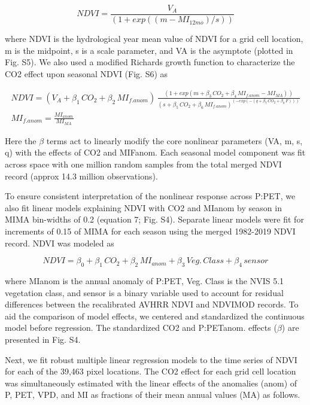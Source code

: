 \documentclass[gc, manuscript]{copernicus}
\begin{document}
\begin{equation}
NDVI = \frac{V_A}{(1+exp((m-MI_{12mo})/s))}
\end{equation}

where NDVI is the hydrological year mean value of NDVI for a grid cell
location, m is the midpoint, s is a scale parameter, and VA is the
asymptote (plotted in Fig. S5). We also used a modified Richards growth
function to characterize the CO2 effect upon seasonal NDVI (Fig. S6) as

\begin{align}
NDVI=(V_A+\beta_1\,CO_2+\beta_2\,MI_{f.anom})\,\frac{(1+exp(m+\beta_3\,CO_2+\beta_4\,MI_{f.anom} - MI_{MA}))}{(s+\beta_5\,CO_2+\beta_6\,MI_{f.anom})^{(-exp(-(q+\beta_7\,CO_2+\beta_8\,F)))}}\\
MI_{f.anom} = \frac{MI_{anom}}{MI_{MA}}\nonumber
\end{align}

Here the \(\beta\) terms act to linearly modify the core nonlinear
parameters (VA, m, s, q) with the effects of CO2 and MIFanom. Each
seasonal model component was fit across space with one million random
samples from the total merged NDVI record (approx 14.3 million
observations).

To ensure consistent interpretation of the nonlinear response across
P:PET, we also fit linear models explaining NDVI with CO2 and MIanom by
season in MIMA bin-widths of 0.2 (equation 7; Fig. S4). Separate linear
models were fit for increments of 0.15 of MIMA for each season using the
merged 1982-2019 NDVI record. NDVI was modeled as

\begin{equation}
NDVI = \beta_0+\beta_1\,CO_2 + \beta_2\,MI_{anom}+\beta_3\,Veg.\,Class+\beta_4\,sensor
\end{equation}

where MIanom is the annual anomaly of P:PET, Veg. Class is the NVIS 5.1
vegetation class, and sensor is a binary variable used to account for
residual differences between the recalibrated AVHRR NDVI and NDVIMOD
records. To aid the comparison of model effects, we centered and
standardized the continuous model before regression. The standardized
CO2 and P:PETanom. effects (\(\beta\)) are presented in Fig. S4.

Next, we fit robust multiple linear regression models to the time series
of NDVI for each of the 39,463 pixel locations. The CO2 effect for each
grid cell location was simultaneously estimated with the linear effects
of the anomalies (anom) of P, PET, VPD, and MI as fractions of their
mean annual values (MA) as follows.
\end{document}
